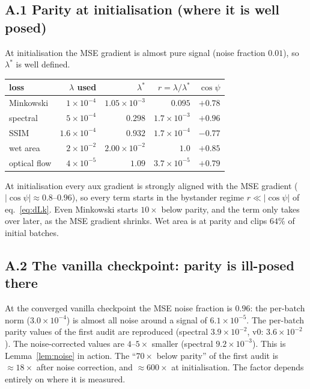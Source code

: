 \documentclass[11pt,a4paper]{article}
\theoremstyle{definition}
\theoremstyle{remark}
\begin{document}
\subsection*{A.1 Parity at initialisation (where it is well posed)}
At initialisation the MSE gradient is almost pure signal (noise fraction $0.01$), so
$\lambda^*$ is well defined.
\begin{center}
\begin{tabular}{@{}lrrrr@{}}
\toprule
loss & $\lambda$ used & $\lambda^*$ & $r=\lambda/\lambda^*$ & $\cos\psi$ \\ \midrule
Minkowski   & $1\times10^{-4}$   & $1.05\times10^{-3}$ & $0.095$              & $+0.78$ \\
spectral    & $5\times10^{-4}$   & $0.298$             & $1.7\times10^{-3}$   & $+0.96$ \\
SSIM        & $1.6\times10^{-4}$ & $0.932$             & $1.7\times10^{-4}$   & $-0.77$ \\
wet area    & $2\times10^{-2}$   & $2.00\times10^{-2}$ & $1.0$                & $+0.85$ \\
optical flow& $4\times10^{-5}$   & $1.09$              & $3.7\times10^{-5}$   & $+0.79$ \\ \bottomrule
\end{tabular}
\end{center}
At initialisation every aux gradient is strongly aligned with the MSE gradient
($|\cos\psi|\approx0.8$--$0.96$), so every term starts in the bystander regime
$r\ll|\cos\psi|$ of eq.~\eqref{eq:dLk}. Even Minkowski starts $10\times$ below parity, and the
term only takes over later, as the MSE gradient shrinks. Wet area is at parity and clips
$64\%$ of initial batches.

\subsection*{A.2 The vanilla checkpoint: parity is ill-posed there}
At the converged vanilla checkpoint the MSE noise fraction is $0.96$: the per-batch norm
($3.0\times10^{-4}$) is almost all noise around a signal of $6.1\times10^{-5}$. The per-batch
parity values of the first audit are reproduced (spectral $3.9\times10^{-2}$, v0:
$3.6\times10^{-2}$). The noise-corrected values are $4$--$5\times$ smaller (spectral
$9.2\times10^{-3}$). This is Lemma~\ref{lem:noise} in action. The ``$70\times$ below parity''
of the first audit is $\approx18\times$ after noise correction, and $\approx600\times$ at
initialisation. The factor depends entirely on where it is measured.
\end{document}
